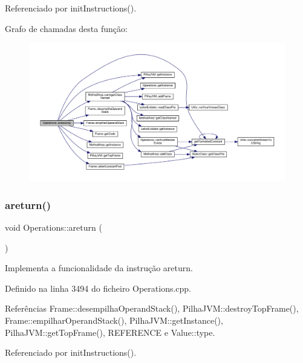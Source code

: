 Referenciado por init\+Instructions().

Grafo de chamadas desta função\+:
\nopagebreak
\begin{figure}[H]
\begin{center}
\leavevmode
\includegraphics[width=350pt]{classOperations_aa5110e66aa565e9130be292935ef5c71_cgraph}
\end{center}
\end{figure}
\mbox{\label{classOperations_a5829421b72f92d50dea0461953b26c5b}} 
\subsubsection{\texorpdfstring{areturn()}{areturn()}}
{\footnotesize\ttfamily void Operations\+::areturn (\begin{DoxyParamCaption}{ }\end{DoxyParamCaption})\hspace{0.3cm}{\ttfamily [private]}}



Implementa a funcionalidade da instrução areturn. 



Definido na linha 3494 do ficheiro Operations.\+cpp.



Referências Frame\+::desempilha\+Operand\+Stack(), Pilha\+J\+V\+M\+::destroy\+Top\+Frame(), Frame\+::empilhar\+Operand\+Stack(), Pilha\+J\+V\+M\+::get\+Instance(), Pilha\+J\+V\+M\+::get\+Top\+Frame(), R\+E\+F\+E\+R\+E\+N\+CE e Value\+::type.



Referenciado por init\+Instructions().

